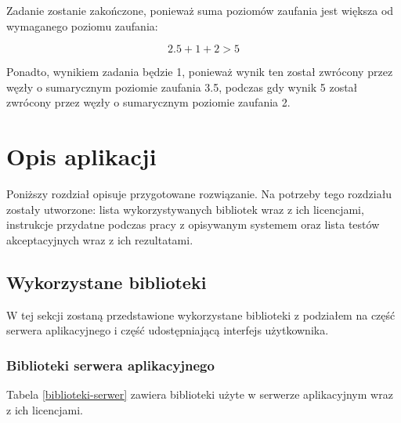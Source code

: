 \documentclass[a4paper,11pt,twoside]{report}
\theoremstyle{definition}
\begin{document}
Zadanie zostanie zakończone, ponieważ suma poziomów zaufania jest większa od wymaganego poziomu zaufania:

$$2.5 + 1 + 2 > 5$$

Ponadto, wynikiem zadania będzie 1, ponieważ wynik ten został zwrócony przez węzły o sumarycznym poziomie zaufania 3.5, podczas gdy wynik 5 został zwrócony przez węzły o sumarycznym poziomie zaufania 2.

\chapter{Opis aplikacji}
    Poniższy rozdział opisuje przygotowane rozwiązanie. Na potrzeby tego rozdziału zostały utworzone: lista wykorzystywanych bibliotek wraz z ich licencjami, instrukcje przydatne podczas pracy z opisywanym systemem oraz lista testów akceptacyjnych wraz z ich rezultatami.
    
    \section{Wykorzystane biblioteki}
         W tej sekcji zostaną przedstawione wykorzystane biblioteki z podziałem na część serwera aplikacyjnego i część udostępniającą interfejs użytkownika.
        
        \subsection{Biblioteki serwera aplikacyjnego}
        Tabela \ref{biblioteki-serwer} zawiera biblioteki użyte w serwerze aplikacyjnym wraz z ich licencjami.
        
\end{document}
